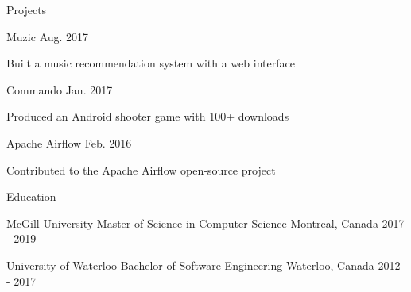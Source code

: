 \documentclass[12pt]{simple-resume}
\begin{document}
%
\begin{rSection}{Projects}%
\begin{entry}
      {Muzic}
      {}
      {Aug. 2017}
      {}%
    \begin{entryItems}
        \item {Built a music recommendation system with a web interface}
    \end{entryItems}
\end{entry}
%
\begin{entry}
      {Commando}
      {}
      {}
      {Jan. 2017}%
    \begin{entryItems}
        \item {Produced an Android shooter game with 100+ downloads}
    \end{entryItems}
\end{entry}
%
\begin{entry}
    {Apache Airflow}
    {} 
    {}
    {Feb. 2016}%
    \begin{entryItems}%
        \item {Contributed to the Apache Airflow open-source project}
    \end{entryItems}
\end{entry}
\end{rSection}
%
\begin{rSection}{Education}%
\begin{entry}
    {McGill University}
    {Master of Science in Computer Science}
    {Montreal, Canada}
    {2017 - 2019}%
\end{entry}
\begin{entry}
    {University of Waterloo}
    {Bachelor of Software Engineering}
    {Waterloo, Canada}
    {2012 - 2017}%
\end{entry}
\end{rSection}
\end{document}

